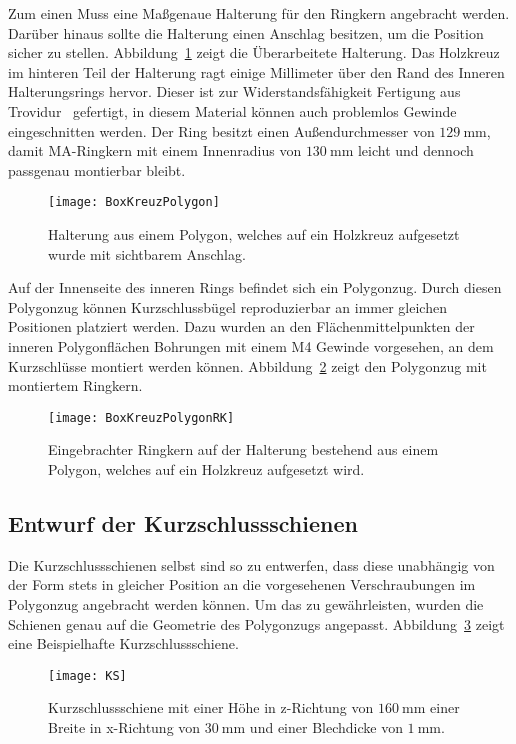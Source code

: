 \newpage



Zum einen Muss eine Ma\ss{}genaue Halterung f\"ur den Ringkern angebracht werden. Dar\"uber hinaus sollte die Halterung einen Anschlag besitzen, um die Position sicher zu stellen. Abbildung~\ref{fig:BoxKreuzPolygon} zeigt die \"Uberarbeitete Halterung. Das Holzkreuz im hinteren Teil der Halterung ragt einige Millimeter \"uber den Rand des Inneren Halterungsrings hervor. Dieser ist zur Widerstandsf\"ahigkeit Fertigung aus Trovidur~\cite{roechling2016} gefertigt, in diesem Material k\"onnen auch problemlos Gewinde eingeschnitten werden. Der Ring besitzt einen Au\ss{}endurchmesser von $\SI{129}{\milli\meter}$, damit MA-Ringkern mit einem Innenradius von $\SI{130}{\milli\meter}$ leicht und dennoch passgenau montierbar bleibt.

\begin{figure}[htb]
	\centering
	\texttt{[image: BoxKreuzPolygon]}
	\caption{Halterung aus einem Polygon, welches auf ein Holzkreuz aufgesetzt wurde mit sichtbarem Anschlag.}
	\label{fig:BoxKreuzPolygon}
\end{figure}

Auf der Innenseite des inneren Rings befindet sich ein Polygonzug. Durch diesen Polygonzug k\"onnen Kurzschlussb\"ugel reproduzierbar an immer gleichen Positionen platziert werden. Dazu wurden an den Fl\"achenmittelpunkten der inneren Polygonfl\"achen Bohrungen mit einem M4 Gewinde vorgesehen, an dem Kurzschl\"usse montiert werden k\"onnen. Abbildung~\ref{fig:BoxKreuzPolygonRK} zeigt den Polygonzug mit montiertem Ringkern.

\begin{figure}[htb]
	\centering
	\texttt{[image: BoxKreuzPolygonRK]}
	\caption{Eingebrachter Ringkern auf der Halterung bestehend aus einem Polygon, welches auf ein Holzkreuz aufgesetzt wird.}
	\label{fig:BoxKreuzPolygonRK}
\end{figure}


\newpage



\subsection{Entwurf der Kurzschlussschienen}
\label{sec:shorts}
Die Kurzschlussschienen selbst sind so zu entwerfen, dass diese unabh\"angig von der Form stets in gleicher Position an die vorgesehenen Verschraubungen im Polygonzug angebracht werden k\"onnen. Um das zu gew\"ahrleisten, wurden die Schienen genau auf die Geometrie des Polygonzugs angepasst. Abbildung~\ref{fig:TZKS} zeigt eine Beispielhafte Kurzschlussschiene.
\par
\begin{figure}[htb]
	\centering
	\texttt{[image: KS]}
	\caption{Kurzschlussschiene mit einer H\"ohe in z-Richtung von $\SI{160}{\milli\meter}$ einer Breite in x-Richtung von $\SI{30}{\milli\meter}$ und einer Blechdicke von $\SI{1}{\milli\meter}$.}
	\label{fig:TZKS}
\end{figure}

